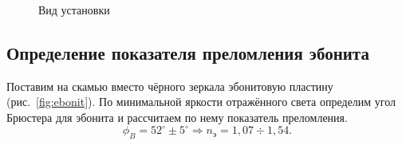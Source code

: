 \documentclass[a4paper, 12pt]{article}
\begin{document}
\begin{figure}[h!]
\begin{minipage}[h!]{0.3\linewidth}
		\end{minipage}
		\hfill
		\caption{Вид установки}
		\label{fig:polaroids}
\end{figure}

\newpage

\subsection{Определение показателя преломления эбонита}

Поставим на скамью вместо чёрного зеркала эбонитовую пластину (рис.~\ref{fig:ebonit}). По минимальной яркости отражённого света определим угол Брюстера для эбонита и рассчитаем по нему показатель преломления. $$\phi_B = 52^{\circ}\pm5^{\circ} \Rightarrow n_{э} = 1,07\div1,54.$$

\begin{figure}[h!]
        \begin{minipage}[h!]{0.3\linewidth}

\end{minipage}
\end{figure}
\end{document}

